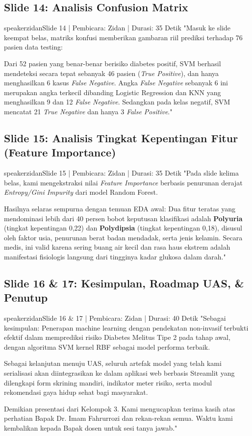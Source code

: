 \documentclass[11pt,a4paper]{article}
\begin{document}
\subsection{Slide 14: Analisis Confusion Matrix}
\begin{scriptbox}{speakerzidan}{Slide 14 | Pembicara: Zidan | Durasi: 35 Detik}
"Masuk ke slide keempat belas, matriks konfusi memberikan gambaran riil prediksi terhadap 76 pasien data testing:

Dari 52 pasien yang benar-benar berisiko diabetes positif, SVM berhasil mendeteksi secara tepat sebanyak 46 pasien (\textit{True Positive}), dan hanya menghasilkan 6 kasus \textit{False Negative}. 
Angka \textit{False Negative} sebanyak 6 ini merupakan angka terkecil dibanding Logistic Regression dan KNN yang menghasilkan 9 dan 12 \textit{False Negative}. 
Sedangkan pada kelas negatif, SVM mencatat 21 \textit{True Negative} dan hanya 3 \textit{False Positive}."
\end{scriptbox}

\subsection{Slide 15: Analisis Tingkat Kepentingan Fitur (Feature Importance)}
\begin{scriptbox}{speakerzidan}{Slide 15 | Pembicara: Zidan | Durasi: 35 Detik}
"Pada slide kelima belas, kami mengekstraksi nilai \textit{Feature Importance} berbasis penurunan derajat \textit{Entropy/Gini Impurity} dari model Random Forest.

Hasilnya selaras sempurna dengan temuan EDA awal:
Dua fitur teratas yang mendominasi lebih dari 40 persen bobot keputusan klasifikasi adalah \textbf{Polyuria} (tingkat kepentingan 0,22) dan \textbf{Polydipsia} (tingkat kepentingan 0,18), disusul oleh faktor usia, penurunan berat badan mendadak, serta jenis kelamin.
Secara medis, ini valid karena sering buang air kecil dan rasa haus ekstrem adalah manifestasi fisiologis langsung dari tingginya kadar glukosa dalam darah."
\end{scriptbox}

\subsection{Slide 16 \& 17: Kesimpulan, Roadmap UAS, \& Penutup}
\begin{scriptbox}{speakerzidan}{Slide 16 \& 17 | Pembicara: Zidan | Durasi: 40 Detik}
"Sebagai kesimpulan:
Penerapan machine learning dengan pendekatan non-invasif terbukti efektif dalam memprediksi risiko Diabetes Melitus Tipe 2 pada tahap awal, dengan algoritma SVM kernel RBF sebagai model performa terbaik.

Sebagai kelanjutan menuju UAS, seluruh artefak model yang telah kami serialisasi akan diintegrasikan ke dalam aplikasi web berbasis Streamlit yang dilengkapi form skrining mandiri, indikator meter risiko, serta modul rekomendasi gaya hidup sehat bagi masyarakat.

Demikian presentasi dari Kelompok 3. Kami mengucapkan terima kasih atas perhatian Bapak Dr. Imam Fahrurrozi dan rekan-rekan semua. Waktu kami kembalikan kepada Bapak dosen untuk sesi tanya jawab."
\end{scriptbox}
\end{document}
